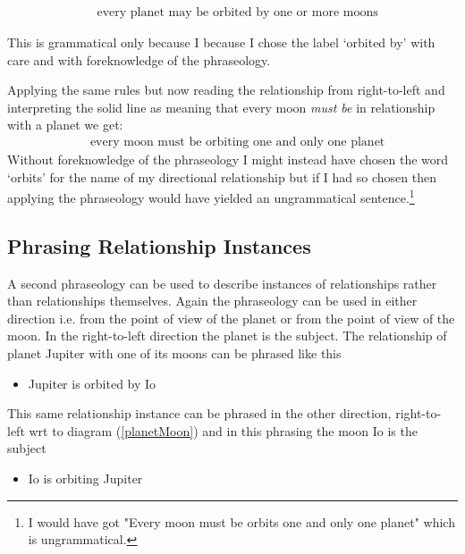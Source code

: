 \begin{align}
&\mbox{every planet may be orbited by one or more moons} 
\end{align}

This is grammatical only because I 
because I chose the label `orbited by' with care and with foreknowledge of the  phraseology.
 
Applying the same rules but now reading  the relationship from right-to-left and interpreting the solid line as 
 meaning that every moon \textit{must be} in relationship with a planet we get:
\begin{align}
&\mbox{every moon must be orbiting  one and only one planet} 
\end{align}
Without foreknowledge of the phraseology I might instead have chosen the word `orbits' for the name of my directional relationship but if I had so chosen then applying the phraseology would have yielded an ungrammatical sentence.\footnote{I would have got "Every moon must be orbits one and only one planet" which is ungrammatical.}

\subsection*{Phrasing Relationship Instances}
\mynote
A second phraseology can be used to describe instances of relationships rather than relationships themselves. 
Again the phraseology can be used in either direction i.e. from the point of view
of the planet or from the point of view of the moon.
In the right-to-left direction the planet is the subject. The relationship of planet Jupiter with one of its moons can be phrased like this

\begin{itemize}
\renewcommand\labelitemi{--}
\item Jupiter is orbited by Io
\end{itemize}

This same relationship instance can be phrased in the other direction, right-to-left wrt to diagram (\ref{planetMoon}) and in this phrasing the moon Io is the subject

\begin{itemize}
\renewcommand\labelitemi{--}
\item Io is orbiting  Jupiter
\end{itemize}

